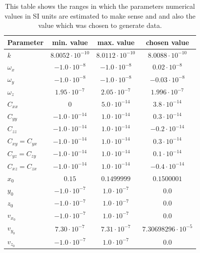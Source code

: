 \documentclass[prb,preprint]{revtex4-1}
\begin{document}
\begin{table}[h]
	\centering
	\caption{This table shows the ranges in which the parameters numerical values in SI units are estimated to make sense and and also the value which was chosen to generate data.}
	\begin{ruledtabular}
		\begin{tabular}{l c c c}
			Parameter & min. value & max. value & chosen value \\
			\hline	%
			$k$ & $8.0052 \cdot 10^{-10}$ & $8.0112 \cdot 10^{-10}$ & $8.0088 \cdot 10^{-10}$ \\
			$\omega_x$ & $-1.0 \cdot 10^{-8}$ & $-1.0 \cdot 10^{-8}$ & $0.02 \cdot 10^{-8}$ \\
			$\omega_y$ & $-1.0 \cdot 10^{-8}$ & $-1.0 \cdot 10^{-8}$ & $-0.03 \cdot 10^{-8}$ \\
			$\omega_z$ & $1.95 \cdot 10^{-7}$ & $2.05 \cdot 10^{-7}$ & $1.996 \cdot 10^{-7}$ \\
			$C_{xx}$ & 0 & $5.0 \cdot 10^{-14}$ & $3.8 \cdot 10^{-14}$ \\
			$C_{yy}$ & $-1.0 \cdot 10^{-14}$ & $1.0 \cdot 10^{-14}$ & $0.3 \cdot 10^{-14}$ \\
			$C_{zz}$ & $-1.0 \cdot 10^{-14}$ & $1.0 \cdot 10^{-14}$ & $-0.2 \cdot 10^{-14}$ \\
			$C_{xy} = C_{yx}$ & $-1.0 \cdot 10^{-14}$ & $1.0 \cdot 10^{-14}$ & $0.3 \cdot 10^{-14}$ \\
			$C_{yz} = C_{zy}$ & $-1.0 \cdot 10^{-14}$ & $1.0 \cdot 10^{-14}$ & $0.1 \cdot 10^{-14}$ \\
			$C_{xz} = C_{zx}$ & $-1.0 \cdot 10^{-14}$ & $1.0 \cdot 10^{-14}$ & $-0.4 \cdot 10^{-14}$ \\
			$x_0$ & $0.15$ & $0.1499999$ & $0.1500001$ \\
			$y_0$ & $-1.0 \cdot 10^{-7}$ & $1.0 \cdot 10^{-7}$ & $0.0$ \\ 
			$z_0$ & $-1.0 \cdot 10^{-7}$ & $1.0 \cdot 10^{-7}$ & $0.0$ \\ 
			$v_{x_0}$ & $-1.0 \cdot 10^{-7}$ & $1.0 \cdot 10^{-7}$ & $0.0$ \\ 
			$v_{y_0}$ & $7.30 \cdot 10^{-7}$ & $7.31 \cdot 10^{-7}$ & $7.30698296 \cdot 10^{-5}$ \\
			$v_{z_0}$ & $-1.0 \cdot 10^{-7}$ & $1.0 \cdot 10^{-7}$ & $0.0$ \\
		\end{tabular}
	\end{ruledtabular}
	\label{tab:parameters}
\end{table}
\end{document}
